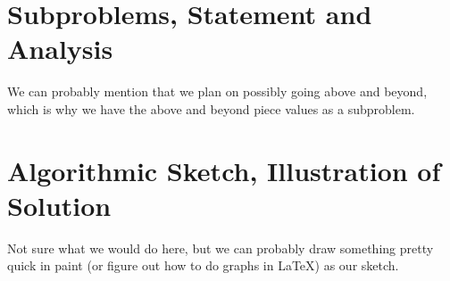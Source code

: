\documentclass[12pt]{article}
\begin{document}
    \section{Subproblems, Statement and Analysis}

    We can probably mention that we plan on possibly going above and beyond, which is why we have the above and beyond piece values as a subproblem.

    \section{Algorithmic Sketch, Illustration of Solution}

    Not sure what we would do here, but we can probably draw something pretty quick in paint (or figure out how to do graphs in 
    \LaTeX) as our sketch.
    
\end{document}
